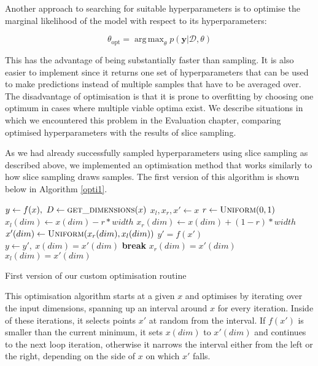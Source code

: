 \documentclass[a4paper,12pt,twoside,openright]{report}
\newcommand{\Break}{\State \textbf{break} }
\DeclareMathOperator*{\argmax}{arg\,max}
\begin{document}
Another approach to searching for suitable hyperparameters is to optimise the marginal likelihood of the model with respect to its hyperparameters:

\begin{equation}
\theta_{\text{opt}} = \argmax_\theta p(\mathbf{y}|\mathcal{D}, \theta)
\end{equation}


This has the advantage of being substantially faster than sampling. It is also easier to implement since it returns one set of hyperparameters that can be used to make predictions instead of multiple samples that have to be averaged over. The disadvantage of optimisation is that it is prone to overfitting by choosing one optimum in cases where multiple viable optima exist. We describe situations in which we encountered this problem in the Evaluation chapter, comparing optimised hyperparameters with the results of slice sampling.

As we had already successfully sampled hyperparameters using slice sampling as described above, we implemented an optimisation method that works similarly to how slice sampling draws samples. The first version of this algorithm is shown below in Algorithm \ref{opti1}.

\begin{algorithm}[t]
\begin{algorithmic}[1]
\State $y\gets f(x),\ D\gets \Call{get\_dimensions}{x}$
\State $x_l, x_r, x'\gets x$
\State $r\gets \Call{Uniform}{0, 1}$
\State $x_l(dim)\gets x(dim) - r * width$
\State $x_r(dim)\gets x(dim) + (1 - r) * width$
\State $x'(dim)\gets \Call{Uniform}{x_r(dim), x_l(dim)}$
\State $y' = f(x')$
\State $y\gets y',\ x(dim) = x'(dim)$
\Break
\EndIf
{}
\State $x_r(dim) = x'(dim)$
\State $x_l(dim) = x'(dim)$
\EndIf
\EndFor
\EndFor
\EndFor
\EndProcedure
\end{algorithmic}
\caption{First version of our custom optimisation routine}
\label{opti1}
\end{algorithm}

This optimisation algorithm starts at a given $x$ and optimises by iterating over the input dimensions, spanning up an interval around $x$ for every iteration. Inside of these iterations, it selects points $x'$ at random from the interval. If $f(x')$ is smaller than the current minimum, it sets $x(dim)$ to $x'(dim)$ and continues to the next loop iteration, otherwise it narrows the interval either from the left or the right, depending on the side of $x$ on which $x'$ falls.
\end{document}
